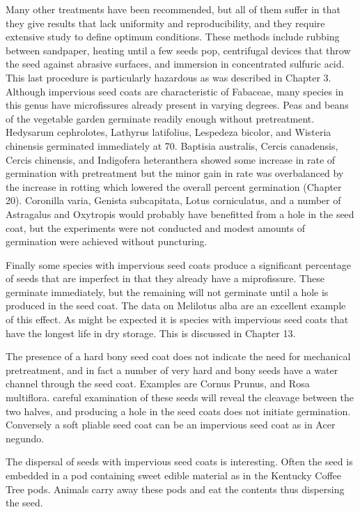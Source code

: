 Many other treatments have been recommended, but all of them suffer in that
they give results that lack uniformity and reproducibility, and they require extensive
study to define optimum conditions. These methods include rubbing between
sandpaper, heating until a few seeds pop, centrifugal devices that throw the seed
against abrasive surfaces, and immersion in concentrated sulfuric acid. This last
procedure is particularly hazardous as was described in Chapter 3.
Although impervious seed coats are characteristic of Fabaceae, many species
in this genus have microfissures already present in varying degrees. Peas and beans
of the vegetable garden germinate readily enough without pretreatment. Hedysarum
cephrolotes, Lathyrus latifolius, Lespedeza bicolor, and Wisteria chinensis germinated
immediately at 70. Baptisia australis, Cercis canadensis, Cercis chinensis, and
Indigofera heteranthera showed some increase in rate of germination with
pretreatment but the minor gain in rate was overbalanced by the increase in rotting
which lowered the overall percent germination (Chapter 20). Coronilla varia, Genista
subcapitata, Lotus corniculatus, and a number of Astragalus and Oxytropis would
probably have benefitted from a hole in the seed coat, but the experiments were not
conducted and modest amounts of germination were achieved without puncturing.

Finally some species with impervious seed coats produce a significant
percentage of seeds that are imperfect in that they already have a miprofissure. These
germinate immediately, but the remaining will not germinate until a hole is produced in
the seed coat. The data on Melilotus alba are an excellent example of this effect.
As might be expected it is species with impervious seed coats that have the
longest life in dry storage. This is discussed in Chapter 13.

The presence of a hard bony seed coat does not indicate the need for
mechanical pretreatment, and in fact a number of very hard and bony seeds have a
water channel through the seed coat. Examples are Cornus Prunus, and Rosa
multiflora. careful examination of these seeds will reveal the cleavage between the
two halves, and producing a hole in the seed coats does not initiate germination.
Conversely a soft pliable seed coat can be an impervious seed coat as in Acer negundo.

The dispersal of seeds with impervious seed coats is interesting. Often the
seed is embedded in a pod containing sweet edible material as in the Kentucky Coffee
Tree pods. Animals carry away these pods and eat the contents thus dispersing the
seed.

